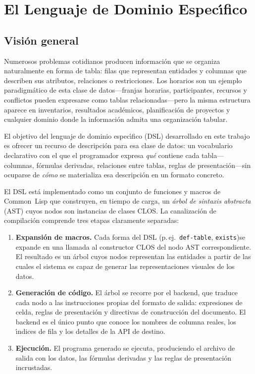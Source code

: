 \documentclass[12pt,a4paper]{report}
\begin{document}
\chapter{El Lenguaje de Dominio Espec\'{\i}fico}
\label{cap:dsl}

\section{Visi\'on general}
\label{sec:vision-general}

Numerosos problemas cotidianos producen informaci\'on que se organiza
naturalmente en forma de tabla: filas que representan entidades y columnas
que describen sus atributos, relaciones o restricciones.  Los horarios son
un ejemplo paradigm\'atico de esta clase de datos---franjas horarias,
participantes, recursos y conflictos pueden expresarse como tablas
relacionadas---pero la misma estructura aparece en inventarios, resultados
acad\'emicos, planificaci\'on de proyectos y cualquier dominio donde la
informaci\'on admita una organizaci\'on tabular.

El objetivo del lenguaje de dominio espec\'{\i}fico (DSL) desarrollado en
este trabajo es ofrecer un recurso de descripci\'on para esa clase de datos:
un vocabulario declarativo con el que el programador expresa \emph{qu\'e}
contiene cada tabla---columnas, f\'ormulas derivadas, relaciones entre
tablas, reglas de presentaci\'on---sin ocuparse de \emph{c\'omo} se
materializa esa descripci\'on en un formato concreto.

El DSL est\'a implementado como un conjunto de funciones y macros de
Common~Lisp que construyen, en tiempo de carga, un \emph{\'arbol de sintaxis
abstracta} (AST) cuyos nodos son instancias de clases CLOS.  La canalizaci\'on
de compilaci\'on comprende tres etapas claramente separadas:

\begin{enumerate}
  \item \textbf{Expansi\'on de macros.}  Cada forma del DSL
    (p.\,ej.\ \texttt{def-table}, \texttt{exists})se expande en una llamada al constructor
    CLOS del nodo AST correspondiente.  El resultado es un \'arbol cuyos
    nodos representan las entidades a partir de las cuales el sistema es
    capaz de generar las representaciones visuales de los datos.

  \item \textbf{Generaci\'on de c\'odigo.}  El \'arbol se recorre por el
    backend, que traduce cada nodo a las instrucciones propias del formato de
    salida: expresiones de celda, reglas de presentaci\'on y directivas de
    construcci\'on del documento.  El backend es el \'unico punto que conoce
    los nombres de columna reales, los \'{\i}ndices de fila y los detalles
    de la API de destino.

  \item \textbf{Ejecuci\'on.}  El programa generado se ejecuta, produciendo
    el archivo de salida con los datos, las f\'ormulas derivadas y las reglas
    de presentaci\'on incrustadas.
\end{enumerate}
\end{document}
